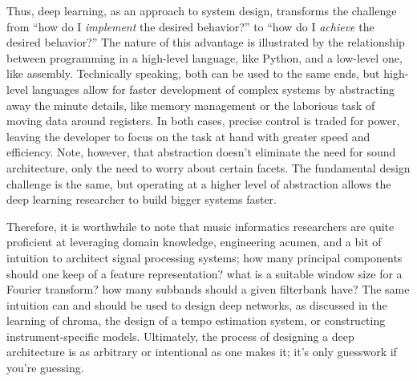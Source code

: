 
Thus, deep learning, as an approach to system design, transforms the challenge from ``how do I \emph{implement} the desired behavior?'' to ``how do I \emph{achieve} the desired behavior?''
The nature of this advantage is illustrated by the relationship between programming in a high-level language, like Python, and a low-level one, like assembly.
Technically speaking, both can be used to the same ends, but high-level languages allow for faster development of complex systems by abstracting away the minute details, like memory management or the laborious task of moving data around registers.
In both cases, precise control is traded for power, leaving the developer to focus on the task at hand with greater speed and efficiency.
Note, however, that abstraction doesn't eliminate the need for sound architecture, only the need to worry about certain facets.
The fundamental design challenge is the same, but operating at a higher level of abstraction allows the deep learning researcher to build bigger systems faster.

Therefore, it is worthwhile to note that music informatics researchers are quite proficient at leveraging domain knowledge, engineering acumen, and a bit of intuition to architect signal processing systems;
how many principal components should one keep of a feature representation?
what is a suitable window size for a Fourier transform?
how many subbands should a given filterbank have?
The same intuition can and should be used to design deep networks, as discussed in the learning of chroma, the design of a tempo estimation system, or constructing instrument-specific models.
Ultimately, the process of designing a deep architecture is as arbitrary or intentional as one makes it; it's only guesswork if you're guessing.


